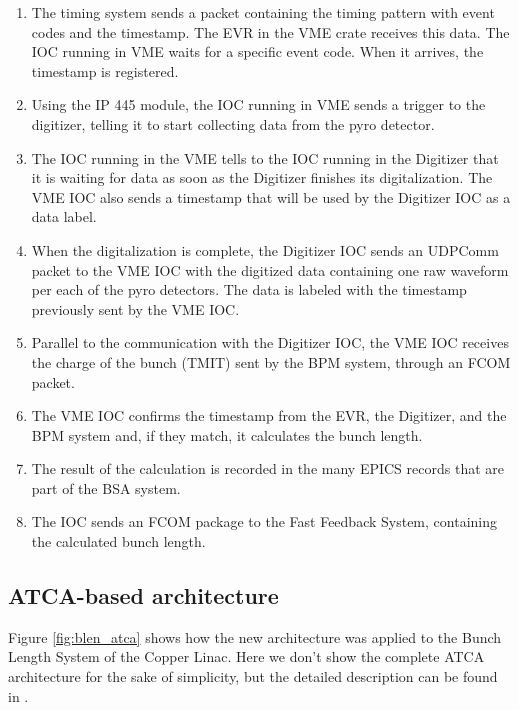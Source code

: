 \documentclass[letter,
        biblatex,   %
        keeplastbox,  %
        ]{jacow}
\begin{document}
\begin{enumerate}
  \item The timing system sends a packet containing the timing pattern with event codes and the timestamp. The EVR in the VME crate receives this data. The IOC running in VME waits for a specific event code. When it arrives, the timestamp is registered.
  \item Using the IP 445 module, the IOC running in VME sends a trigger to the digitizer, telling it to start collecting data from the pyro detector.
  \item The IOC running in the VME tells to the IOC running in the Digitizer that it is waiting for data as soon as the Digitizer finishes its digitalization. The VME IOC also sends a timestamp that will be used by the Digitizer IOC as a data label.
  \item When the digitalization is complete, the Digitizer IOC sends an UDPComm packet to the VME IOC with the digitized data containing one raw waveform per each of the pyro detectors. The data is labeled with the timestamp previously sent by the VME IOC. 
  \item Parallel to the communication with the Digitizer IOC, the VME IOC receives the charge of the bunch (TMIT) sent by the BPM system, through an FCOM packet.
  \item The VME IOC confirms the timestamp from the EVR, the Digitizer, and the BPM system and, if they match, it calculates the bunch length.
  \item The result of the calculation is recorded in the many EPICS records that are part of the BSA system.
  \item The IOC sends an FCOM package to the Fast Feedback System, containing the calculated bunch length.
\end{enumerate}

\subsection{ATCA-based architecture}
Figure \ref{fig:blen_atca} shows how the new architecture was applied to the Bunch Length System of the Copper Linac. Here we don't show the complete ATCA architecture for the sake of simplicity, but the detailed description can be found in \cite{ryan-2016, atca-bpm-2017}.
\end{document}
